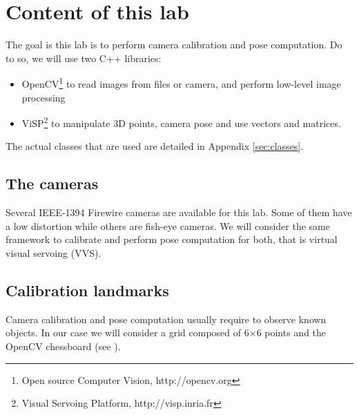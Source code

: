 \documentclass{ecnreport}
\begin{document}




\section{Content of this lab}

The goal is this lab is to perform camera calibration and pose computation. Do to so, we will use two C++ libraries:
\begin{itemize}
 \item OpenCV\footnote{Open source Computer Vision, http://opencv.org} to read images from files or camera, and perform low-level image processing
 \item ViSP\footnote{Visual Servoing Platform, http://visp.inria.fr} to manipulate 3D points, camera pose and use vectors and matrices.
\end{itemize}
The actual classes that are used are detailed in Appendix \ref{sec:classes}.

\subsection{The cameras}

Several IEEE-1394 Firewire cameras are available for this lab. Some of them have a low distortion while others are fish-eye cameras. We will consider the 
same framework to calibrate and perform pose computation for both, that is virtual visual servoing (VVS).

\subsection{Calibration landmarks}

Camera calibration and pose computation usually require to observe known objects. In our case we will consider a grid composed of 6$\times$6 points and
the OpenCV chessboard (see ).
\end{document}
